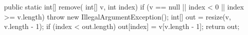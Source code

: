 \begin{unipdcode}[language=Java,
  basicstyle=\ttfamily\scriptsize, numbers=none,
  xleftmargin=0.6em, xrightmargin=0.6em,
  framexleftmargin=0.2em]
public static int[] remove(
        int[] v, int index) {
    if (v == null || index < 0
            || index >= v.length)
        throw new IllegalArgumentException();
    int[] out = resize(v, v.length - 1);
    if (index < out.length)
        out[index] = v[v.length - 1];
    return out;
}
\end{unipdcode}
